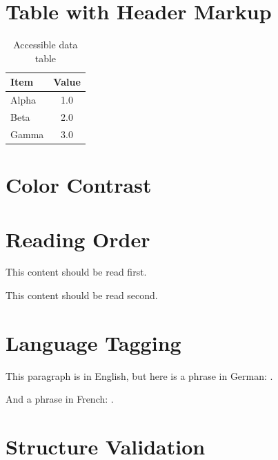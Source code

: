 \documentclass[
    doctype=article,
    institution=none,
]{../../omnilatex}
\begin{document}

\section{Table with Header Markup}

\begin{table}[htbp]
    \centering
    \caption{Accessible data table}
    \begin{tabular}{lc}
        \toprule
        \textbf{Item} & \textbf{Value} \\
        \midrule
        Alpha & 1.0 \\
        Beta  & 2.0 \\
        Gamma & 3.0 \\
        \bottomrule
    \end{tabular}
\end{table}

\section{Color Contrast}


\section{Reading Order}

This content should be read first.

This content should be read second.

\section{Language Tagging}

This paragraph is in English, but here is a phrase in German:
.

And a phrase in French: .

\section{Structure Validation}

\validatstructure
\end{document}
